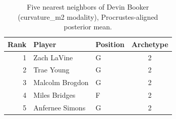 \begin{table}[htbp]
  \centering\small
  \begin{tabular}{rllc}
    \toprule
    Rank & Player & Position & Archetype \\
    \midrule
    1 & Zach LaVine & G & 2 \\
    2 & Trae Young & G & 2 \\
    3 & Malcolm Brogdon & G & 2 \\
    4 & Miles Bridges & F & 2 \\
    5 & Anfernee Simons & G & 2 \\
    \bottomrule
  \end{tabular}
  \caption{Five nearest neighbors of Devin Booker (curvature_m2 modality), Procrustes-aligned posterior mean.}
  \label{tab:Devin_Booker_neighbors_curvature_m2}
\end{table}

